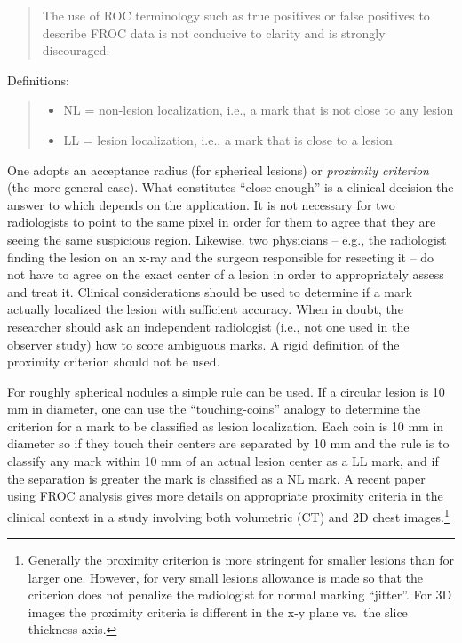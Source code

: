 \documentclass[
]{book}
\providecommand{\tightlist}{%
  \setlength{\itemsep}{0pt}\setlength{\parskip}{0pt}}
\begin{document}
\begin{quote}
The use of ROC terminology such as true positives or false positives to describe FROC data is not conducive to clarity and is strongly discouraged.
\end{quote}

Definitions:

\begin{quote}
\begin{itemize}
\tightlist
\item
  NL = non-lesion localization, i.e., a mark that is not close to any lesion
\item
  LL = lesion localization, i.e., a mark that is close to a lesion
\end{itemize}
\end{quote}

One adopts an acceptance radius (for spherical lesions) or \emph{proximity criterion} (the more general case). What constitutes ``close enough'' is a clinical decision the answer to which depends on the application. It is not necessary for two radiologists to point to the same pixel in order for them to agree that they are seeing the same suspicious region. Likewise, two physicians -- e.g., the radiologist finding the lesion on an x-ray and the surgeon responsible for resecting it -- do not have to agree on the exact center of a lesion in order to appropriately assess and treat it. Clinical considerations should be used to determine if a mark actually localized the lesion with sufficient accuracy. When in doubt, the researcher should ask an independent radiologist (i.e., not one used in the observer study) how to score ambiguous marks. A rigid definition of the proximity criterion should not be used.

For roughly spherical nodules a simple rule can be used. If a circular lesion is 10 mm in diameter, one can use the ``touching-coins'' analogy to determine the criterion for a mark to be classified as lesion localization. Each coin is 10 mm in diameter so if they touch their centers are separated by 10 mm and the rule is to classify any mark within 10 mm of an actual lesion center as a LL mark, and if the separation is greater the mark is classified as a NL mark. A recent paper \citep{Dobbins2016MultiInstitutional} using FROC analysis gives more details on appropriate proximity criteria in the clinical context in a study involving both volumetric (CT) and 2D chest images.\footnote{Generally the proximity criterion is more stringent for smaller lesions than for larger one. However, for very small lesions allowance is made so that the criterion does not penalize the radiologist for normal marking ``jitter''. For 3D images the proximity criteria is different in the x-y plane vs.~the slice thickness axis.}
\end{document}

